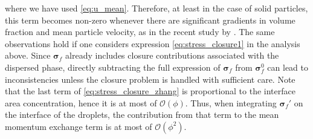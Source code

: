 where we have used \ref{eq:u_mean}.
Therefore, at least in the case of solid particles, this term becomes non-zero whenever there are significant gradients in volume fraction and mean particle velocity, as in the recent study by \citet{wang2024effect}.
The same observations hold if one considers expression \ref{eq:stress_closure1} in the analysis above. 
Since $\bm\sigma_f$ already includes closure contributions associated with the dispersed phase, directly subtracting the full expression of $\bm\sigma_f$ from $\bm\sigma_f^0$ can lead to inconsistencies unless the closure problem is handled with sufficient care. 
Note that the last term of \ref{eq:stress_closure_zhang} is proportional to the interface area concentration, hence it is at most of $\mathcal{O}(\phi)$.
Thus, when integrating $\bm\sigma_f'$ on the interface of the droplets, the contribution from that term to the mean momentum exchange term is at most of $\mathcal{O}(\phi^2)$. 

